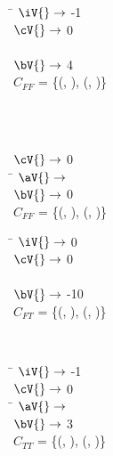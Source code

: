 \begin{subfigure}[t]{\textwidth}
  \begin{tabbing}
    \qquad \quad \= $\iV{} \rightarrow$ -1 \\
    \> $\cV{} \rightarrow$ 0 \\
    \\
    \> $\bV{} \rightarrow$ 4 \\
    \quad $C_{FF}$ = \{(\AV{}, \false{}), (\BV{}, \false{})\} \\
  \end{tabbing}
\end{subfigure}%
~
\begin{subfigure}[t]{\textwidth}
  \begin{tabbing}
    \qquad \quad \=  \\
    \> $\cV{} \rightarrow$ 0 \\
    \qquad \quad \= $\aV{} \rightarrow$ \fls{} \\
    \> $\bV{} \rightarrow$ 0 \\
    \quad $C_{FF}$ = \{(\AV{}, \false{}), (\BV{}, \true{})\} \\
  \end{tabbing}
\end{subfigure}%
\vfill
\begin{subfigure}[t]{\textwidth}
  \begin{tabbing}
    \qquad \quad \= $\iV{} \rightarrow$ 0 \\
    \> $\cV{} \rightarrow$ 0 \\
    \\
    \> $\bV{} \rightarrow$ -10 \\
    \quad $C_{FT}$ = \{(\AV{}, \true{}), (\BV{}, \false{})\} \\
  \end{tabbing}
\end{subfigure}%
~
\begin{subfigure}[t]{\textwidth}
  \begin{tabbing}
    \qquad \quad \= $\iV{} \rightarrow$ -1 \\
    \> $\cV{} \rightarrow$ 0 \\
    \qquad \quad \= $\aV{} \rightarrow$ \tru{} \\
    \> $\bV{} \rightarrow$ 3 \\
    \quad $C_{TT}$ = \{(\AV{}, \true{}), (\BV{}, \true{})\} \\
  \end{tabbing}
\end{subfigure}%